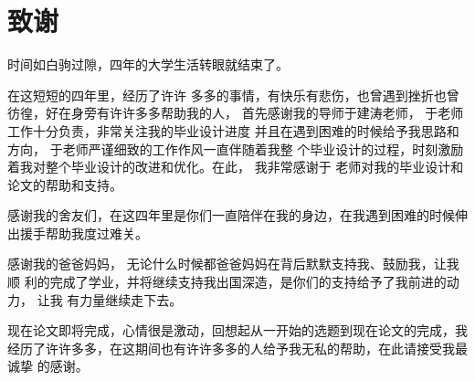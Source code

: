\chapter*{致谢}
\fancyhead{}
时间如白驹过隙，四年的大学生活转眼就结束了。

在这短短的四年里，经历了许许
多多的事情，有快乐有悲伤，也曾遇到挫折也曾彷徨，好在身旁有许许多多帮助我的人，
首先感谢我的导师于建涛老师， 于老师工作十分负责，非常关注我的毕业设计进度
并且在遇到困难的时候给予我思路和方向， 于老师严谨细致的工作作风一直伴随着我整
个毕业设计的过程，时刻激励着我对整个毕业设计的改进和优化。在此， 我非常感谢于
老师对我的毕业设计和论文的帮助和支持。

感谢我的舍友们，在这四年里是你们一直陪伴在我的身边，在我遇到困难的时候伸
出援手帮助我度过难关。

感谢我的爸爸妈妈， 无论什么时候都爸爸妈妈在背后默默支持我、鼓励我，让我顺
利的完成了学业，并将继续支持我出国深造，是你们的支持给予了我前进的动力， 让我
有力量继续走下去。

现在论文即将完成，心情很是激动，回想起从一开始的选题到现在论文的完成，我
经历了许许多多，在这期间也有许许多多的人给予我无私的帮助，在此请接受我最诚挚
的感谢。